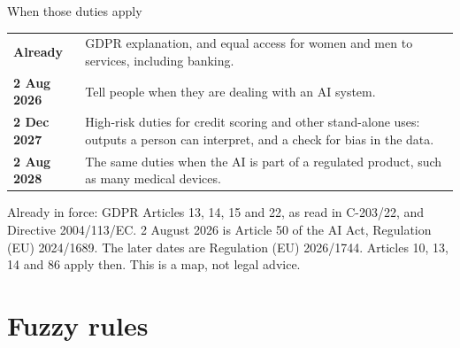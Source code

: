 \documentclass[aspectratio=169,11pt]{beamer}
\begin{document}
\begin{frame}{When those duties apply}
  \small
  \renewcommand{\arraystretch}{1.35}
  \begin{tabular}{@{}l p{}@{}}
    \textcolor{ebdnavy}{\textbf{Already}} &
      GDPR explanation, and equal access for women and men to services, including banking. \\
    \textcolor{ebdnavy}{\textbf{2 Aug 2026}} &
      Tell people when they are dealing with an AI system. \\
    \textcolor{ebdnavy}{\textbf{2 Dec 2027}} &
      High-risk duties for credit scoring and other stand-alone uses: outputs a person can interpret, and a check for bias in the data. \\
    \textcolor{ebdnavy}{\textbf{2 Aug 2028}} &
      The same duties when the AI is part of a regulated product, such as many medical devices. \\
  \end{tabular}

  \vspace{0.45em}
  {\scriptsize\color{ebdmuted}Already in force: GDPR Articles 13, 14, 15 and 22, as read in C-203/22, and Directive 2004/113/EC.
  2 August 2026 is Article 50 of the AI Act, Regulation (EU) 2024/1689.
  The later dates are Regulation (EU) 2026/1744. Articles 10, 13, 14 and 86 apply then. This is a map, not legal advice.}
\end{frame}

\section{Fuzzy rules}
\end{document}
